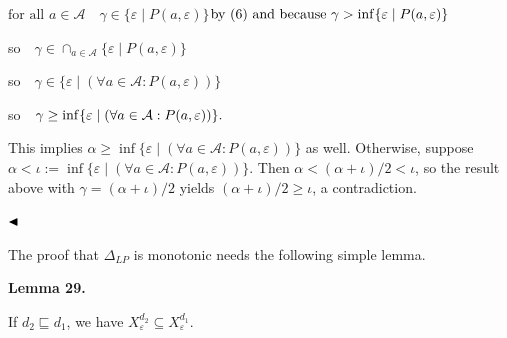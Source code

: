 \par  \quad  $\displaystyle\mbox{for all }a\in\mathcal{A}$\quad  $\displaystyle\quad\gamma\in\{\varepsilon\mid P(a,\varepsilon)\}$\quad  $\displaystyle\mbox{by\nobreak\ (6) and because }\gamma>\inf\{\varepsilon\mid P(a,\varepsilon)\}$\quad  \quad  
 
\par  \quad  so\quad  $\displaystyle\quad\gamma\in\cap_{a\in\mathcal{A}}\{\varepsilon\mid P(a,\varepsilon)\}$\quad  \quad  
 
\par  \quad  so\quad  $\displaystyle\quad\gamma\in\{\varepsilon\mid(\forall a\in\mathcal{A}:P(a,\varepsilon))\}$\quad  \quad  
 
\par  \quad  so\quad  $\displaystyle\quad\gamma\geq\inf\{\varepsilon\mid(\forall a\in\mathcal{A}:P(a,\varepsilon))\}.\hskip-11.38109pt$\quad  \quad  
  
This implies $\alpha\geq\inf\{\varepsilon\mid(\forall a\in\mathcal{A}:P(a,\varepsilon))\}$ as well. Otherwise, suppose $\alpha<\iota:=\inf\{\varepsilon\mid(\forall a\in\mathcal{A}:P(a,\varepsilon))\}$. Then $\alpha<(\alpha+\iota)/2<\iota$, so the result above with $\gamma=(\alpha+\iota)/2$ yields $(\alpha+\iota)/2\geq\iota$, a contradiction.\par
 
   
$\hfill\blacktriangleleft$\par
 
 
 
The proof that $\Delta_{LP}$ is monotonic needs the following simple lemma.\par
 
 
 
\par\medskip\noindent\textbf{Lemma 29.}\par
 
 
If $d_{2}\sqsubseteq d_{1}$, we have $X^{d_{2}}_{\varepsilon}\subseteq X^{d_{1}}_{\varepsilon}$.\par
 
 
 


